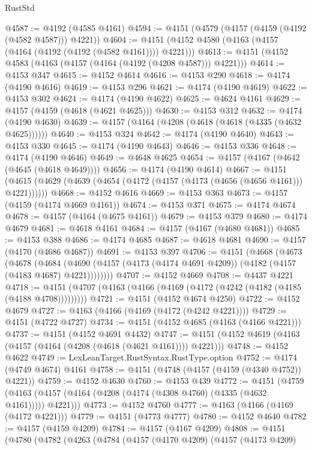 \begin{lexlean}{RustStd}
\begin{coremodule}
@4587 := @4192 (@4585 @4161)
@4594 := @4151 (@4579 (@4157 (@4159 (@4192 (@4582 @4587))) @4221))
@4604 := @4151 (@4152 @4580 (@4163 (@4157 (@4164 (@4192 (@4192 (@4582 @4161)))) @4221)))
@4613 := @4151 (@4152 @4583 (@4163 (@4157 (@4164 (@4192 (@4208 @4587))) @4221)))
@4614 := @4153 @347
@4615 := @4152 @4614
@4616 := @4153 @290
@4618 := @4174 (@4190 @4616)
@4619 := @4153 @296
@4621 := @4174 (@4190 @4619)
@4622 := @4153 @302
@4624 := @4174 (@4190 @4622)
@4625 := @4624 @4161
@4629 := @4157 (@4159 (@4618 (@4621 @4625)))
@4630 := @4153 @312
@4632 := @4174 (@4190 @4630)
@4639 := @4157 (@4164 (@4208 (@4618 (@4618 (@4335 (@4632 @4625))))))
@4640 := @4153 @324
@4642 := @4174 (@4190 @4640)
@4643 := @4153 @330
@4645 := @4174 (@4190 @4643)
@4646 := @4153 @336
@4648 := @4174 (@4190 @4646)
@4649 := @4648 @4625
@4654 := @4157 (@4167 (@4642 (@4645 (@4618 @4649))))
@4656 := @4174 (@4190 @4614)
@4667 := @4151 (@4615 (@4629 (@4639 (@4654 (@4172 (@4157 (@4173 (@4656 (@4656 @4161))) @4221))))))
@4668 := @4152 @4616
@4669 := @4153 @363
@4673 := @4157 (@4159 (@4174 @4669 @4161))
@4674 := @4153 @371
@4675 := @4174 @4674
@4678 := @4157 (@4164 (@4675 @4161))
@4679 := @4153 @379
@4680 := @4174 @4679
@4681 := @4618 @4161
@4684 := @4157 (@4167 (@4680 @4681))
@4685 := @4153 @388
@4686 := @4174 @4685
@4687 := @4618 @4681
@4690 := @4157 (@4170 (@4686 @4687))
@4691 := @4153 @397
@4706 := @4151
    (@4668
      (@4673
        (@4678
          (@4684 (@4690 (@4157 (@4173 (@4174 @4691 @4209)) (@4182 (@4157 (@4183 @4687) @4221))))))))
@4707 := @4152 @4669
@4708 := @4437 @4221
@4718 := @4151 (@4707 (@4163 (@4166 (@4169 (@4172 (@4242 (@4182 (@4185 (@4188 @4708)))))))))
@4721 := @4151 (@4152 @4674 @4250)
@4722 := @4152 @4679
@4727 := @4163 (@4166 (@4169 (@4172 (@4242 @4221))))
@4729 := @4151 (@4722 @4727)
@4734 := @4151 (@4152 @4685 (@4163 (@4166 @4221)))
@4737 := @4151 (@4152 @4691 @4432)
@4747 := @4151 (@4152 @4619 (@4163 (@4157 (@4164 (@4208 (@4618 (@4621 @4161)))) @4221)))
@4748 := @4152 @4622
@4749 := LexLeanTarget.RustSyntax.RustType.option
@4752 := @4174 (@4749 @4674) @4161
@4758 := @4151 (@4748 (@4157 (@4159 (@4340 @4752)) @4221))
@4759 := @4152 @4630
@4760 := @4153 @439
@4772 := @4151
    (@4759 (@4163 (@4157 (@4164 (@4208 (@4174 (@4308 @4760) (@4335 (@4632 @4161))))) @4221)))
@4773 := @4152 @4760
@4777 := @4163 (@4166 (@4169 (@4172 @4221)))
@4779 := @4151 (@4773 @4777)
@4780 := @4152 @4640
@4782 := @4157 (@4159 @4209)
@4784 := @4157 (@4167 @4209)
@4808 := @4151
    (@4780
      (@4782
        (@4263
          (@4784
            (@4157
              (@4170 @4209)
              (@4157
                (@4173 @4209)

\end{coremodule}
\end{lexlean}

